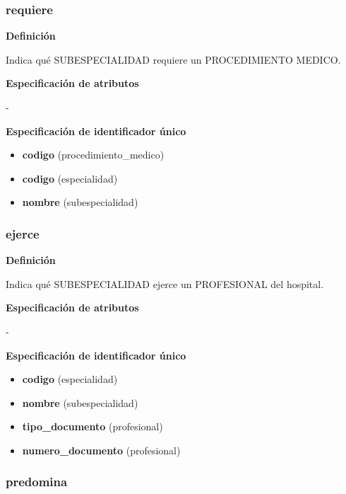 \documentclass[a4paper,11pt]{article}
\begin{document}
\subsubsection{\textbf{requiere}}

\textbf{Definición}

Indica qué SUBESPECIALIDAD requiere un PROCEDIMIENTO MEDICO.

\textbf{Especificación de atributos}

-

\textbf{Especificación de identificador único}

\begin{itemize}

     \item \textbf{codigo} (procedimiento\_medico)

     \item \textbf{codigo} (especialidad)

     \item \textbf{nombre} (subespecialidad)

\end{itemize}

\subsubsection{\textbf{ejerce}}

\textbf{Definición}

Indica qué SUBESPECIALIDAD ejerce un PROFESIONAL del hospital.

\textbf{Especificación de atributos}

-

\textbf{Especificación de identificador único}

\begin{itemize}

     \item \textbf{codigo} (especialidad)

     \item \textbf{nombre} (subespecialidad)

     \item \textbf{tipo\_documento} (profesional)

     \item \textbf{numero\_documento} (profesional)

\end{itemize}

\subsubsection{\textbf{predomina}}
\end{document}
